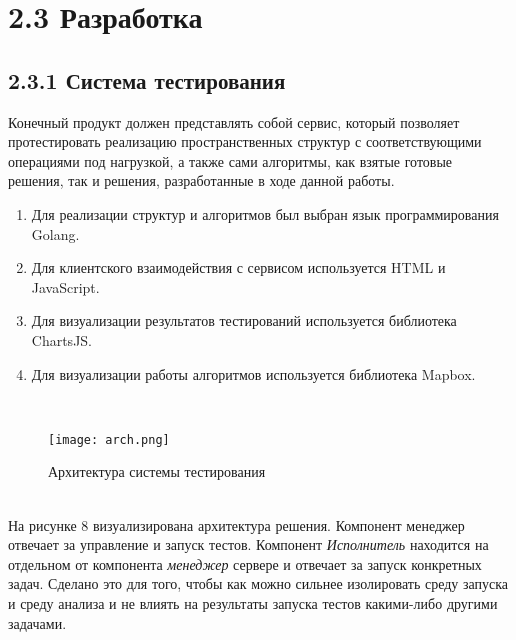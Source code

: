 \section{2.3 Разработка}
\label{cha:development}

\subsection{2.3.1 Система тестирования}
Конечный продукт должен представлять собой сервис, который позволяет протестировать реализацию пространственных структур с соответствующими операциями под нагрузкой, а также сами алгоритмы, как взятые готовые решения, так и решения, разработанные в ходе данной работы. 
\begin{enumerate}
    \item Для реализации структур и алгоритмов был выбран язык программирования Golang.  
    \item Для клиентского взаимодействия с сервисом используется HTML и JavaScript.
    \item Для визуализации результатов тестирований используется библиотека ChartsJS.
    \item Для визуализации работы алгоритмов используется библиотека Mapbox.
\end{enumerate}
  \\
\begin{figure}[h]
    \centering
    \texttt{[image: arch.png]}
    \caption{Архитектура системы тестирования}
\end{figure}
  \\
На рисунке 8 визуализирована архитектура решения. Компонент менеджер отвечает за управление и запуск тестов. Компонент \textit{Исполнитель} находится на отдельном от компонента \textit{менеджер} сервере и отвечает за запуск конкретных задач. Сделано это для того, чтобы как можно сильнее изолировать среду запуска и среду анализа и не влиять на результаты запуска тестов какими-либо другими задачами. 




